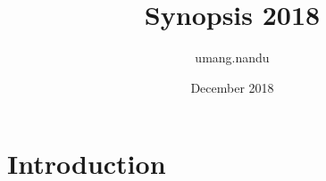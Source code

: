 \documentclass{article}
\title{Synopsis 2018}
\author{umang.nandu }
\date{December 2018}
\begin{document}
\maketitle

\section{Introduction}
\end{document}
